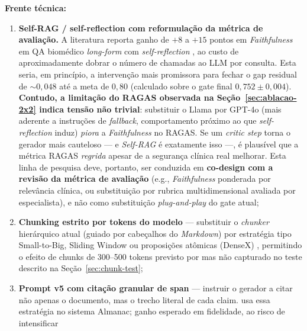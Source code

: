 \documentclass[
  12pt,
  oneside,
  a4paper,
  english,
  brazil
]{abntex2}
\begin{document}
\textbf{Frente técnica:}

\begin{enumerate}[label=\textbf{TF\arabic*}]
  \item \textbf{Self-RAG / self-reflection com reformulação da métrica de
        avaliação.} A literatura reporta ganho de $+8$ a $+15$ pontos em
        \textit{Faithfulness} em QA biomédico \textit{long-form} com
        \textit{self-reflection} \cite{jeong2024selfbiorag}, ao custo de
        aproximadamente dobrar o número de chamadas ao LLM por consulta.
        Esta seria, em princípio, a intervenção mais promissora para
        fechar o gap residual de $\sim 0{,}048$ até a meta de $0{,}80$
        (calculado sobre o gate final $0{,}752 \pm 0{,}004$).
        \textbf{Contudo, a limitação do RAGAS observada na
        Seção~\ref{sec:ablacao-2x2} indica tensão não trivial}: substituir
        o Llama por GPT-4o (mais aderente a instruções de
        \textit{fallback}, comportamento próximo ao que
        \textit{self-reflection} induz) \emph{piora} a
        \textit{Faithfulness} no RAGAS. Se um \textit{critic step} torna
        o gerador mais cauteloso --- e \textit{Self-RAG} é exatamente
        isso ---, é plausível que a métrica RAGAS \emph{regrida} apesar
        de a segurança clínica real melhorar. Esta linha de pesquisa
        deve, portanto, ser conduzida em \textbf{co-design com a revisão
        da métrica de avaliação} (e.g., \textit{Faithfulness} ponderada
        por relevância clínica, ou substituição por rubrica
        multidimensional avaliada por especialista), e não como
        substituição \emph{plug-and-play} do gate atual;
  \item \textbf{Chunking estrito por tokens do modelo} ---
        substituir o \textit{chunker} hierárquico atual (guiado por
        cabeçalhos do \textit{Markdown}) por estratégia tipo
        Small-to-Big, Sliding Window ou proposições
        atômicas (DenseX) \cite{advancedChunkingRAG2025, gao2024},
        permitindo o efeito de chunks de 300--500 tokens
        previsto por \citeauthor{wang2024bestpractices}
        \cite{wang2024bestpractices} mas não capturado no teste descrito na
        Seção~\ref{sec:chunk-test};
  \item \textbf{Prompt v5 com citação granular de span} ---
        instruir o gerador a citar não apenas o documento, mas o trecho
        literal de cada claim. \citeauthor{zakka2024almanac}
        \cite{zakka2024almanac} usa essa estratégia no sistema Almanac;
        ganho esperado em fidelidade, ao risco de intensificar

\end{enumerate}
\end{document}
